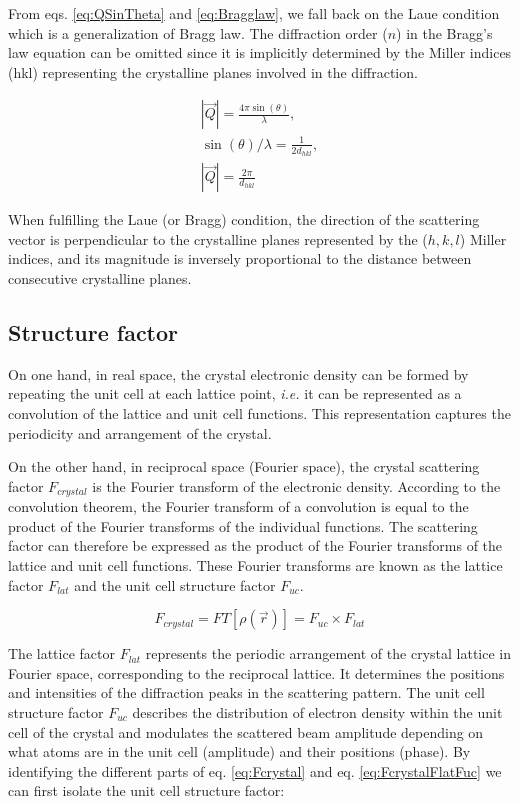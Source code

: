 From eqs. \ref{eq:QSinTheta} and \ref{eq:Bragglaw}, we fall back on the Laue condition which is a generalization of Bragg law. The diffraction order ($n$) in the Bragg's law equation can be omitted since it is implicitly determined by the Miller indices (hkl) representing the crystalline planes involved in the diffraction.

\begin{gather}
    \label{eq:QandD}
    |\vec{Q}| = \frac{4\pi \sin(\theta)}{\lambda},\\
    \sin(\theta) / \lambda = \frac{1}{2d_{hkl}},\\
    |\vec{Q}| = \frac{2\pi}{d_{hkl}}
\end{gather}{}

When fulfilling the Laue (or Bragg) condition, the direction of the scattering vector is perpendicular to the crystalline planes represented by the ($h, k, l$) Miller indices, and its magnitude is inversely proportional to the distance between consecutive crystalline planes.

\subsection{Structure factor} \label{sec:StructureFactor}

On one hand, in real space, the crystal electronic density can be formed by repeating the unit cell at each lattice point, \textit{i.e.} it can be represented as a convolution of the lattice and unit cell functions.
This representation captures the periodicity and arrangement of the crystal.

On the other hand, in reciprocal space (Fourier space), the crystal scattering factor $F_{crystal}$ is the Fourier transform of the electronic density.
According to the convolution theorem, the Fourier transform of a convolution is equal to the product of the Fourier transforms of the individual functions.
The scattering factor can therefore be expressed as the product of the Fourier transforms of the lattice and unit cell functions.
These Fourier transforms are known as the lattice factor $F_{lat}$ and the unit cell structure factor $F_{uc}$.

\begin{equation}
    F_{crystal} = FT[\rho(\vec{r})] = F_{uc} \times F_{lat}
    \label{eq:FcrystalFlatFuc}
\end{equation}

The lattice factor $F_{lat}$ represents the periodic arrangement of the crystal lattice in Fourier space, corresponding to the reciprocal lattice.
It determines the positions and intensities of the diffraction peaks in the scattering pattern.
The unit cell structure factor $F_{uc}$ describes the distribution of electron density within the unit cell of the crystal and modulates the scattered beam amplitude depending on what atoms are in the unit cell (amplitude) and their positions (phase).
By identifying the different parts of eq. \ref{eq:Fcrystal} and eq. \ref{eq:FcrystalFlatFuc} we can first isolate the unit cell structure factor:

